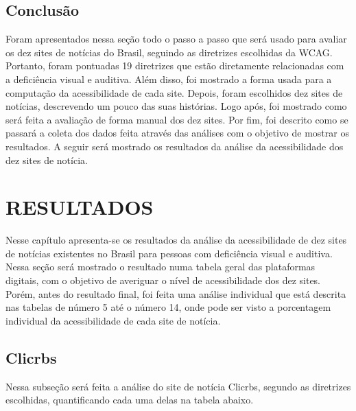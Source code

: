 \documentclass[a4paper]{article}
\begin{document}
\begin{titlepage}
\subsection{Conclusão}

Foram apresentados nessa seção todo o passo a passo que será usado para avaliar os dez sites de notícias do Brasil, seguindo as diretrizes escolhidas da WCAG. Portanto, foram pontuadas 19 diretrizes que estão diretamente relacionadas com a deficiência visual e auditiva. Além disso, foi mostrado a forma usada para a computação da acessibilidade de cada site. Depois, foram escolhidos dez sites de notícias, descrevendo um pouco das suas histórias. Logo após, foi mostrado como será feita a avaliação de forma manual dos dez sites. Por fim, foi descrito como se passará a coleta dos dados feita através das análises com o objetivo de mostrar os resultados. A seguir será mostrado os resultados da análise da acessibilidade dos dez sites de notícia.\\[17cm]

\section{RESULTADOS}

Nesse capítulo apresenta-se os resultados da análise da acessibilidade de dez sites de notícias existentes no Brasil para pessoas com deficiência visual e auditiva. Nessa seção será mostrado o resultado numa tabela geral das plataformas digitais, com o objetivo de averiguar o nível de acessibilidade dos dez sites. Porém, antes do resultado final, foi feita uma análise individual que está descrita nas tabelas de número 5 até o número 14, onde pode ser visto a porcentagem individual da acessibilidade de cada site de notícia.

\subsection{Clicrbs}
\fontsize{12pt}{0pt}\selectfont
\onehalfspacing

Nessa subseção será feita a análise do site de notícia Clicrbs, segundo as diretrizes escolhidas, quantificando cada uma delas na tabela abaixo.\\


\end{titlepage}
\end{document}
